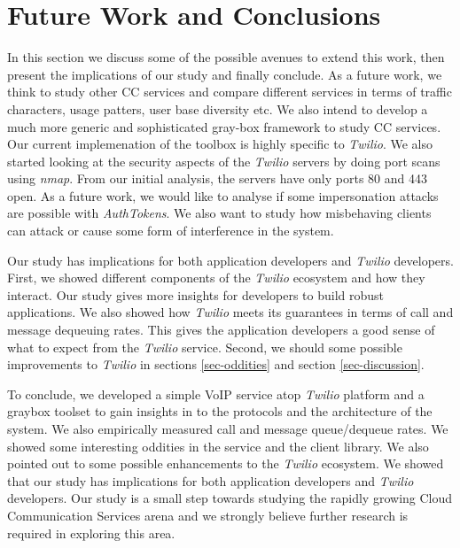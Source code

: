 \section{Future Work and Conclusions}
\label{sec-futureandconclusion}

In this section we discuss some of the possible avenues to extend this work, then present the implications of our study and finally conclude. As a future work, we think to study other CC services and compare different services in terms of traffic characters, usage patters, user base diversity etc. We also intend to develop a much more generic and sophisticated gray-box framework to study CC services. Our current implemenation of the toolbox is highly specific to \textit{Twilio}. We also started looking at the security aspects of the \textit{Twilio} servers by doing port scans using \textit{nmap}. From our initial analysis, the servers have only ports 80 and 443 open. As a future work, we would like to analyse if some impersonation attacks are possible with \textit{AuthTokens}. We also want to study how misbehaving clients can attack or cause some form of interference in the system.

Our study has implications for both application developers and \textit{Twilio} developers. First, we showed different components of the \textit{Twilio} ecosystem and how they interact. Our study gives more insights for developers to build robust applications. We also showed how \textit{Twilio} meets its guarantees in terms of call and message dequeuing rates. This gives the application developers a good sense of what to expect from the \textit{Twilio} service. Second, we should some possible improvements to \textit{Twilio} in sections \ref{sec-oddities} and section \ref{sec-discussion}.

To conclude, we developed a simple VoIP service atop \textit{Twilio} platform and a graybox toolset to gain insights in to the protocols and the architecture of the system. We also empirically measured call and message queue/dequeue rates. We showed some interesting oddities in the service and the client library. We also pointed out to some possible enhancements to the \textit{Twilio} ecosystem. We showed that our study has implications for both application developers and \textit{Twilio} developers. Our study is a small step towards studying the rapidly growing Cloud Communication Services arena and we strongly believe further research is required in exploring this area. 